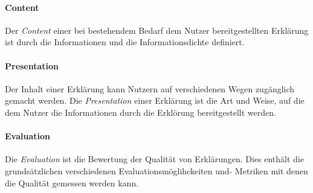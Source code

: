 \paragraph{Content} Der \textit{Content} einer bei bestehendem Bedarf dem Nutzer bereitgestellten Erklärung ist durch die Informationen und die Informationsdichte definiert.

\paragraph{Presentation} Der Inhalt einer Erklärung kann Nutzern auf verschiedenen Wegen zugänglich gemacht werden. Die \textit{Presentation} einer Erklärung ist die Art und Weise, auf die dem Nutzer die Informationen durch die Erklörung bereitgestellt werden.

\paragraph{Evaluation} Die \textit{Evaluation} ist die Bewertung der Qualität von Erklärungen. Dies enthält die grundsätzlichen verschiedenen Evaluationsmöglihckeiten und- Metriken mit denen die Qualität gemessen werden kann.







